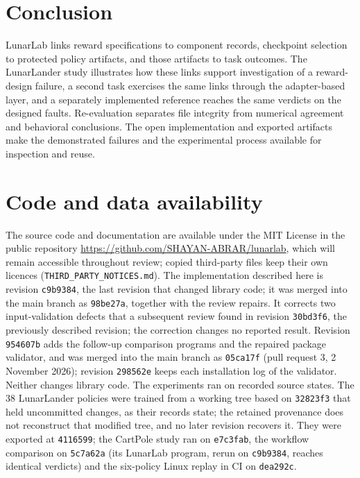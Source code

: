 \documentclass[preprint,12pt]{elsarticle}
\newcommand{\swrev}{c9b9384}
\newcommand{\valrev}{954607b}
\newcommand{\valfix}{298562e}
\begin{document}
\section{Conclusion}
LunarLab links reward specifications to component records, checkpoint selection to protected policy artifacts, and those artifacts to task outcomes. The LunarLander study illustrates how these links support investigation of a reward-design failure, a second task exercises the same links through the adapter-based layer, and a separately implemented reference reaches the same verdicts on the designed faults. Re-evaluation separates file integrity from numerical agreement and behavioral conclusions. The open implementation and exported artifacts make the demonstrated failures and the experimental process available for inspection and reuse.

\FloatBarrier
\section*{Code and data availability}
The source code and documentation are available under the MIT License in the public repository \url{https://github.com/SHAYAN-ABRAR/lunarlab}, which will remain accessible throughout review; copied third-party files keep their own licences (\texttt{THIRD\_PARTY\_NOTICES.md}). The implementation described here is revision \texttt{\swrev}, the last revision that changed library code; it was merged into the main branch as \texttt{98be27a}, together with the review repairs. It corrects two input-validation defects that a subsequent review found in revision \texttt{30bd3f6}, the previously described revision; the correction changes no reported result. Revision \texttt{\valrev} adds the follow-up comparison programs and the repaired package validator, and was merged into the main branch as \texttt{05ca17f} (pull request 3, 2 November 2026); revision \texttt{\valfix} keeps each installation log of the validator. Neither changes library code. The experiments ran on recorded source states. The 38 LunarLander policies were trained from a working tree based on \texttt{32823f3} that held uncommitted changes, as their records state; the retained provenance does not reconstruct that modified tree, and no later revision recovers it. They were exported at \texttt{4116599}; the CartPole study ran on \texttt{e7c3fab}, the workflow comparison on \texttt{5c7a62a} (its LunarLab program, rerun on \texttt{\swrev}, reaches identical verdicts) and the six-policy Linux replay in CI on \texttt{dea292c}.
\end{document}
